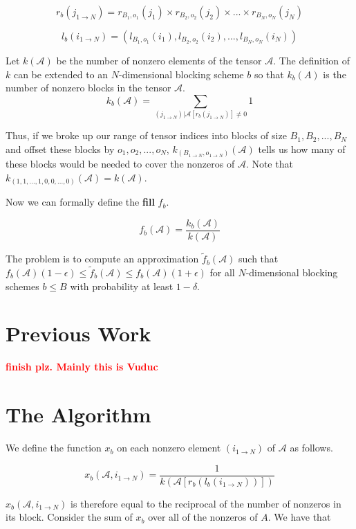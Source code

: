 \documentclass[12pt]{article}
\newcommand{\todo}[1] {\textbf{\textcolor{red}{#1}}}
\newcommand{\Ten}[1] {\mathbf{\mathcal{#1}}}
\begin{document}
    \[
      r_b(j_{1 \to N}) = r_{B_1, o_1}(j_1) \times r_{B_2, o_2}(j_2) \times ... \times r_{B_N, o_N}(j_N)
    \]

    \[
      l_b(i_{1 \to N}) = (l_{B_1, o_1}(i_1), l_{B_2, o_2}(i_2), ..., l_{B_N, o_N}(i_N))
    \]

    Let $k(\Ten{A})$ be the number of nonzero elements of the tensor $\Ten{A}$. The definition of $k$ can be extended to an $N$-dimensional blocking scheme $b$ so that $k_b(A)$ is the number of nonzero blocks in the tensor $\Ten{A}$.
    \[
      k_b(\Ten{A}) = \sum\limits_{(j_{1 \to N}) | \Ten{A}[r_b(j_{1 \to N})] \neq 0} 1
    \]

    Thus, if we broke up our range of tensor indices into blocks of size $B_1, B_2, ..., B_N$ and offset these blocks by $o_1, o_2, ..., o_N$, $k_{(B_{1 \to N}, o_{1 \to N})}(\Ten{A})$ tells us how many of these blocks would be needed to cover the nonzeros of $\Ten{A}$. Note that $k_{(1, 1, ..., 1, 0, 0, ..., 0)}(\Ten{A}) = k(\Ten{A})$.

    Now we can formally define the \textbf{fill} $f_b$.

    \[
      f_b(\Ten{A}) = \frac{k_b(\Ten{A})}{k(\Ten{A})}
    \]

    The problem is to compute an approximation $\tilde{f}_b(\Ten{A})$ such that $f_b(\Ten{A})(1 - \epsilon) \leq \tilde{f}_b(\Ten{A}) \leq f_b(\Ten{A})(1 + \epsilon)$ for all $N$-dimensional blocking schemes $b \leq B$ with probability at least $1 - \delta$.
  \section{Previous Work}
    \todo{finish plz. Mainly this is Vuduc}

  \section{The Algorithm}

    We define the function $x_b$ on each nonzero element $(i_{1 \to N})$ of $\Ten{A}$ as follows.

    \[
      x_b(\Ten{A}, i_{1 \to N}) = \frac{1}{k(\Ten{A}[r_b(l_b(i_{1 \to N}))])}
    \]

    $x_b(\Ten{A}, i_{1 \to N})$ is therefore equal to the reciprocal of the number of nonzeros in its block. Consider the sum of $x_b$ over all of the nonzeros of $A$. We have that
\end{document}
